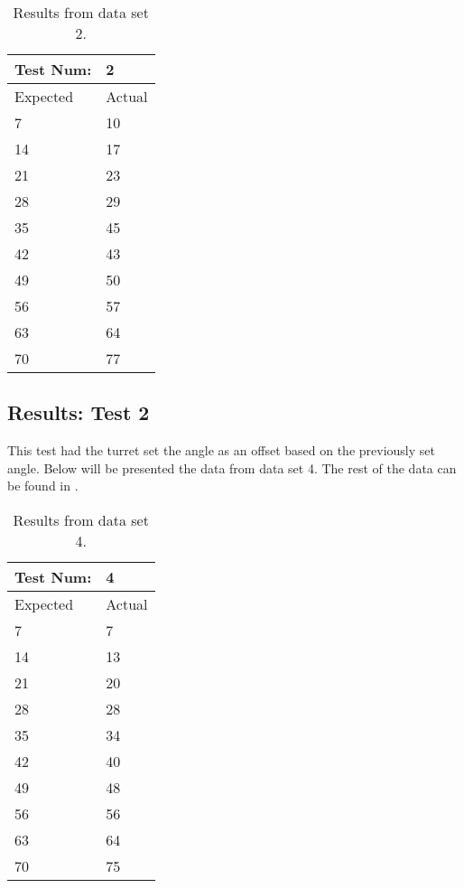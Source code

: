 \begin{table}[H]
\centering
\begin{tabular}{ll}
Test Num:                     & 2      \\ \hline
\multicolumn{1}{l|}{Expected} & Actual \\ \hline
\multicolumn{1}{l|}{7}        & 10     \\
\multicolumn{1}{l|}{14}       & 17     \\
\multicolumn{1}{l|}{21}       & 23     \\
\multicolumn{1}{l|}{28}       & 29     \\
\multicolumn{1}{l|}{35}       & 45     \\
\multicolumn{1}{l|}{42}       & 43     \\
\multicolumn{1}{l|}{49}       & 50     \\
\multicolumn{1}{l|}{56}       & 57     \\
\multicolumn{1}{l|}{63}       & 64     \\
\multicolumn{1}{l|}{70}       & 77
\end{tabular}
\caption{Results from data set 2.}
\label{AngleTest1Result}
\end{table}

\subsection{Results: Test 2}
This test had the turret set the angle as an offset based on the previously set
angle. Below will be presented the data from data set 4.
The rest of the data can be found in .

\begin{table}[H]
\centering
\begin{tabular}{ll}
Test Num:                     & 4      \\ \hline
\multicolumn{1}{l|}{Expected} & Actual \\ \hline
\multicolumn{1}{l|}{7}        & 7     \\
\multicolumn{1}{l|}{14}       & 13     \\
\multicolumn{1}{l|}{21}       & 20     \\
\multicolumn{1}{l|}{28}       & 28     \\
\multicolumn{1}{l|}{35}       & 34     \\
\multicolumn{1}{l|}{42}       & 40     \\
\multicolumn{1}{l|}{49}       & 48     \\
\multicolumn{1}{l|}{56}       & 56     \\
\multicolumn{1}{l|}{63}       & 64     \\
\multicolumn{1}{l|}{70}       & 75
\end{tabular}
\caption{Results from data set 4.}
\label{AngleTest1Result}
\end{table}

